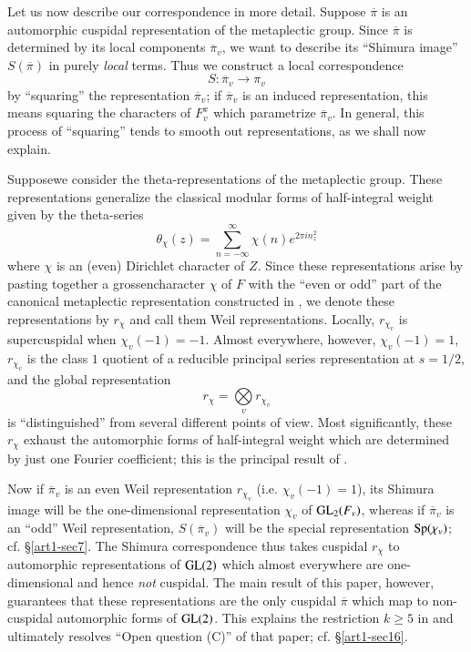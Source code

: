 Let us now describe our correspondence in more detail. Suppose $\overline{\pi}$ is an automorphic cuspidal representation of the metaplectic group. Since $\overline{\pi}$ is determined by its local components $\overline{\pi}_{v}$, we want to describe its ``Shimura image'' $S(\overline{\pi})$ in purely {\em local} terms. Thus we construct a local correspondence
$$
S:\overline{\pi}_{v}\to \pi_{v}
$$
by ``squaring'' the representation $\overline{\pi}_{v}$; if $\overline{\pi}_{v}$ is an induced representation, this means squaring the characters of $F^{x}_{v}$ which parametrize $\overline{\pi}_{v}$. In general, this process of ``squaring'' tends to smooth out representations, as we shall now explain.

Suppose\pageoriginale we consider the theta-representations of the metaplectic group. These representations generalize the classical modular forms of half-integral weight given by the theta-series
$$
\theta_{\chi}(z)=\sum\limits^{\infty}_{n=-\infty}\chi(n)e^{2\pi in^{2}_{z}}
$$
where $\chi$ is an (even) Dirichlet character of $Z$. Since these representations arise by pasting together a grossencharacter $\chi$ of $F$ with the ``even or odd'' part of the canonical metaplectic representation constructed in \cite{Weil}, we denote these representations by $r_{\chi}$ and call them Weil representations. Locally, $r_{\chi_{v}}$ is supercuspidal when $\chi_{v}(-1)=-1$. Almost everywhere, however, $\chi_{v}(-1)=1$, $r_{\chi_{v}}$ is the class $1$ quotient of a reducible principal series representation at $s=1/2$, and the global representation
$$
r_{\chi}=\bigotimes\limits_{v}r_{\chi_{v}}
$$
is ``distinguished'' from several different points of view. Most significantly, these $r_{\chi}$ exhaust the automorphic forms of half-integral weight which are determined by just one Fourier coefficient; this is the principal result of \cite{GePS2}.

Now if $\overline{\pi}_{v}$ is an even Weil representation $r_{\chi_{v}}$ (i.e. $\chi_{v}(-1)=1$), its Shimura image will be the one-dimensional representation $\chi_{v}$ of $\mathrm{GL}_{2}(F_{v})$, whereas if $\overline{\pi}_{v}$ is an ``odd'' Weil representation, $S(\overline{\pi}_{v})$ will be the special representation $\operatorname{Sp}(\chi_{v})$; cf. \S\ref{art1-sec7}. The Shimura correspondence thus takes cuspidal $r_{\chi}$ to automorphic representations of $\mathrm{GL}(2)$ which almost everywhere are one-dimensional and hence {\em not} cuspidal. The main result of this paper, however, guarantees that these representations are the only cuspidal $\overline{\pi}$ which map to non-cuspidal automorphic forms of $\mathrm{GL}(2)$. This explains the restriction $k\geq 5$ in \cite{Shim} and ultimately resolves ``Open question (C)'' of that paper; cf. \S\ref{art1-sec16}.

